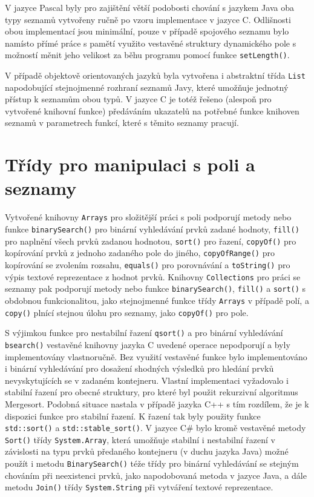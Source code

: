 \documentclass[onepage, a4paper, 12pt]{bakalarka}
\begin{document}
V jazyce Pascal byly pro zajištění větší podobosti chování s jazykem Java oba typy seznamů vytvořeny ručně po vzoru implementace v jazyce C. Odlišnosti obou implementací jsou minimální, pouze v případě spojového seznamu bylo namísto přímé práce s pamětí využito vestavěné struktury dynamického pole s možností měnit jeho velikost za běhu programu pomocí funkce \texttt{setLength()}.\par
V případě objektově orientovaných jazyků byla vytvořena i abstraktní třída \texttt{List} napodobující stejnojmenné rozhraní seznamů Javy, které umožňuje jednotný přístup k seznamům obou typů. V jazyce C je totéž řešeno (alespoň pro vytvořené knihovní funkce) předáváním ukazatelů na potřebné funkce knihoven seznamů v parametrech funkcí, které s těmito seznamy pracují.

\section{Třídy pro manipulaci s poli a seznamy}
Vytvořené knihovny \texttt{Arrays} pro složitější práci s poli podporují metody nebo funkce \texttt{binarySearch()} pro binární vyhledávání prvků zadané hodnoty, \texttt{fill()} pro naplnění všech prvků zadanou hodnotou, \texttt{sort()} pro řazení, \texttt{copyOf()} pro kopírování prvků z jednoho zadaného pole do jiného, \texttt{copyOfRange()} pro kopírování se zvolením rozsahu, \texttt{equals()} pro porovnávání a \texttt{toString()} pro výpis textové reprezentace z hodnot prvků. Knihovny \texttt{Collections} pro práci se seznamy pak podporují metody nebo funkce \texttt{binarySearch()}, \texttt{fill()} a \texttt{sort()} s obdobnou funkcionalitou, jako stejnojmenné funkce třídy \texttt{Arrays} v případě polí, a \texttt{copy()} plnící stejnou úlohu pro seznamy, jako \texttt{copyOf()} pro pole.\par
S výjimkou funkce pro nestabilní řazení \texttt{qsort()} a pro binární vyhledávání \texttt{bsearch()} vestavěné knihovny jazyka C uvedené operace nepodporují a byly implementovány vlastnoručně. Bez využití vestavěné funkce bylo implementováno i binární vyhledávání pro dosažení shodných výsledků pro hledání prvků nevyskytujících se v zadaném kontejneru. Vlastní implementaci vyžadovalo i stabilní řazení pro obecné struktury, pro které byl použit rekurzivní algoritmus Mergesort.
Podobná situace nastala v případě jazyka C++ s tím rozdílem, že je k dispozici funkce pro stabilní řazení. K řazení tak byly použity funkce \texttt{std::sort()} a \texttt{std::stable\_sort()}.
V jazyce C\# bylo kromě vestavěné metody \texttt{Sort()} třídy \texttt{System.Array}, která umožňuje stabilní i nestabilní řazení v závislosti na typu prvků předaného kontejneru (v duchu jazyka Java) možné použít i metodu \texttt{BinarySearch()} téže třídy pro binární vyhledávání se stejným chováním při neexistenci prvků, jako napodobovaná metoda v jazyce Java, a dále metodu \texttt{Join()} třídy \texttt{System.String} při vytváření textové reprezentace.
\end{document}
